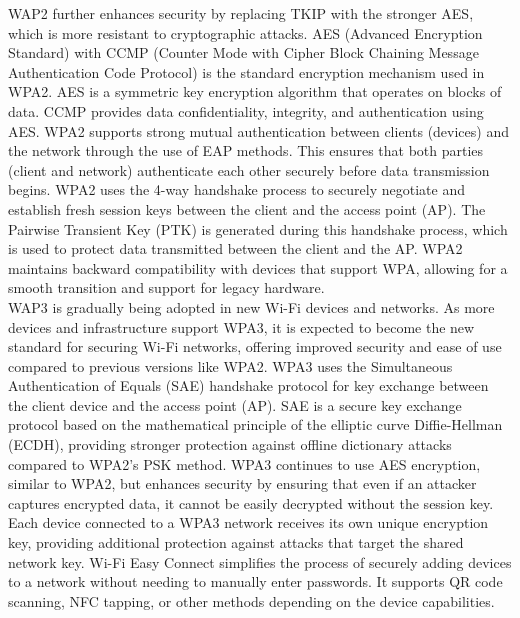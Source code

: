 \documentclass{article}
\begin{document}
	WAP2 further enhances security by replacing TKIP with the stronger AES, which is more resistant to cryptographic attacks. AES (Advanced Encryption Standard) with CCMP (Counter Mode with Cipher Block Chaining Message Authentication Code Protocol) is the standard encryption mechanism used in WPA2. AES is a symmetric key encryption algorithm that operates on blocks of data. CCMP provides data confidentiality, integrity, and authentication using AES. WPA2 supports strong mutual authentication between clients (devices) and the network through the use of EAP methods. This ensures that both parties (client and network) authenticate each other securely before data transmission begins. WPA2 uses the 4-way handshake process to securely negotiate and establish fresh session keys between the client and the access point (AP). The Pairwise Transient Key (PTK) is generated during this handshake process, which is used to protect data transmitted between the client and the AP. WPA2 maintains backward compatibility with devices that support WPA, allowing for a smooth transition and support for legacy hardware.\\

	WAP3 is gradually being adopted in new Wi-Fi devices and networks. As more devices and infrastructure support WPA3, it is expected to become the new standard for securing Wi-Fi networks, offering improved security and ease of use compared to previous versions like WPA2. WPA3 uses the Simultaneous Authentication of Equals (SAE) handshake protocol for key exchange between the client device and the access point (AP). SAE is a secure key exchange protocol based on the mathematical principle of the elliptic curve Diffie-Hellman (ECDH), providing stronger protection against offline dictionary attacks compared to WPA2's PSK method. WPA3 continues to use AES encryption, similar to WPA2, but enhances security by ensuring that even if an attacker captures encrypted data, it cannot be easily decrypted without the session key. Each device connected to a WPA3 network receives its own unique encryption key, providing additional protection against attacks that target the shared network key. Wi-Fi Easy Connect simplifies the process of securely adding devices to a network without needing to manually enter passwords. It supports QR code scanning, NFC tapping, or other methods depending on the device capabilities.\\
	
\end{document}
